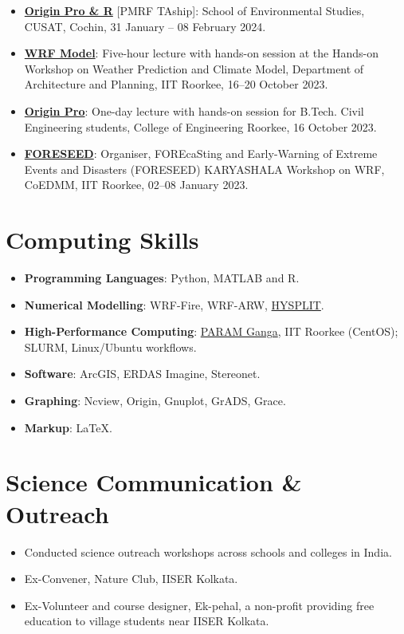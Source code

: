 \documentclass[letterpaper,11pt]{article}
\newcommand{\resumeItem}[1]{
  \item\small{
    {\justifying #1 \vspace{-2pt}}
  }
}
\newcommand{\resumeItemListStart}{\begin{itemize}[itemsep=1pt,parsep=0pt,topsep=2pt]}
\newcommand{\resumeItemListEnd}{\end{itemize}\vspace{-5pt}}
\begin{document}
\begin{justify}
\begin{itemize}[leftmargin=*,itemsep=2pt,parsep=0pt,topsep=2pt]
        \item \small \href{https://anandu-prabhakaran.pages.dev/workshops#W_2024_01}{\textbf{Origin Pro \& R}} [PMRF TAship]: School of Environmental Studies, CUSAT, Cochin, 31 January -- 08 February 2024.
        \item \small \href{https://anandu-prabhakaran.pages.dev/workshops#W_2023_03}{\textbf{WRF Model}}: Five-hour lecture with hands-on session at the Hands-on Workshop on Weather Prediction and Climate Model, Department of Architecture and Planning, IIT Roorkee, 16--20 October 2023.
        \item \small \href{https://anandu-prabhakaran.pages.dev/workshops#W_2023_02}{\textbf{Origin Pro}}: One-day lecture with hands-on session for B.Tech. Civil Engineering students, College of Engineering Roorkee, 16 October 2023.
        \item \small \href{https://anandu-prabhakaran.pages.dev/workshops#W_2023_01}{\textbf{FORESEED}}: Organiser, FOREcaSting and Early-Warning of Extreme Events and Disasters (FORESEED) KARYASHALA Workshop on WRF, CoEDMM, IIT Roorkee, 02--08 January 2023.
      \end{itemize}
\end{justify}
\vspace{-0.15cm}

\section{Computing Skills}
      \resumeItemListStart
        \resumeItem{\textbf{Programming Languages}: Python, MATLAB and R.}
        \resumeItem{\textbf{Numerical Modelling}: WRF-Fire, WRF-ARW, \href{https://www.ready.noaa.gov/HYSPLIT.php}{HYSPLIT}.}
        \resumeItem{\textbf{High-Performance Computing}: \href{https://nsmindia.in/infrastructure/nsm-systems/param-ganga/}{PARAM Ganga}, IIT Roorkee (CentOS); SLURM, Linux/Ubuntu workflows.}
        \resumeItem{\textbf{Software}: ArcGIS, ERDAS Imagine, Stereonet.}
        \resumeItem{\textbf{Graphing}: Ncview, Origin, Gnuplot, GrADS, Grace.}
        \resumeItem{\textbf{Markup}: \LaTeX.}
      \resumeItemListEnd
\vspace{-0.15cm}

\section{Science Communication \& Outreach}
      \resumeItemListStart
        \resumeItem{Conducted science outreach workshops across schools and colleges in India.}
        \resumeItem{Ex-Convener, Nature Club, IISER Kolkata.}
        \resumeItem{Ex-Volunteer and course designer, Ek-pehal, a non-profit providing free education to village students near IISER Kolkata.}
      \resumeItemListEnd
\vspace{-0.15cm}
\end{document}
